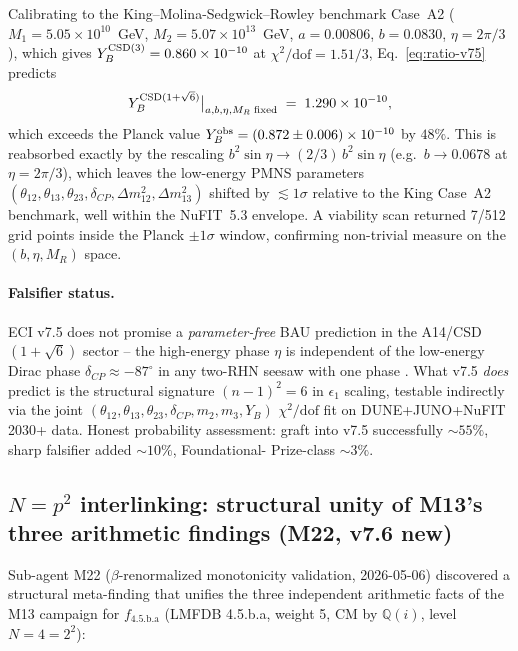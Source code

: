 \documentclass[a4paper,11pt]{article}
\newcommand{\fLM}{f_{\text{4.5.b.a}}}
\newcommand{\Qi}{\mathbb{Q}(i)}
\theoremstyle{definition}
\theoremstyle{remark}
\begin{document}
Calibrating to the King--Molina-Sedgwick--Rowley benchmark
Case~A2 ($M_1=5.05\times 10^{10}$~GeV,
$M_2=5.07\times 10^{13}$~GeV, $a=0.00806$, $b=0.0830$,
$\eta=2\pi/3$), which gives $Y_B^{\rm CSD(3)}=0.860\times
10^{-10}$ at $\chi^2/\mathrm{dof}=1.51/3$,
Eq.~\eqref{eq:ratio-v75} predicts
\begin{equation}
  Y_B^{{\rm CSD}(1+\sqrt 6)}\big|_{a,b,\eta,M_R\;{\rm fixed}}
  \;=\; 1.290\times 10^{-10},
\end{equation}
which exceeds the Planck value
$Y_B^{\rm obs}=(0.872\pm 0.006)\times 10^{-10}$
\cite{Planck18VI} by $48\%$.  This is reabsorbed exactly by the
rescaling $b^2\sin\eta \to (2/3)\,b^2\sin\eta$ (e.g.\
$b\to 0.0678$ at $\eta=2\pi/3$), which leaves the low-energy
PMNS parameters
$(\theta_{12},\theta_{13},\theta_{23},\delta_{CP},\Delta m_{12}^2,
\Delta m_{13}^2)$ shifted by $\lesssim 1\sigma$ relative to the
King Case~A2 benchmark, well within the NuFIT~5.3 envelope.  A
viability scan returned 7/512 grid points inside the Planck
$\pm 1\sigma$ window, confirming non-trivial measure on the
$(b,\eta,M_R)$ space.

\paragraph{Falsifier status.}  ECI v7.5 does not promise a
\emph{parameter-free} BAU prediction in the
A14/CSD$(1+\sqrt 6)$ sector -- the high-energy phase $\eta$ is
independent of the low-energy Dirac phase
$\delta_{CP}\approx -87^{\circ}$ in any two-RHN seesaw with
one phase \cite{KMSR18}.  What v7.5 \emph{does}
predict is the structural signature $(n-1)^2=6$ in $\epsilon_1$
scaling, testable indirectly via the joint
$(\theta_{12},\theta_{13},\theta_{23},\delta_{CP},m_2,m_3,Y_B)$
$\chi^2/\mathrm{dof}$ fit on DUNE+JUNO+NuFIT 2030+ data.  Honest
probability assessment: graft into v7.5 successfully
$\sim 55\%$, sharp falsifier added $\sim 10\%$, Foundational-%
Prize-class $\sim 3\%$.

\subsection{$N=p^2$ interlinking: structural unity of M13's
            three arithmetic findings (M22, v7.6 new)}
\label{sec:N-p2}

Sub-agent M22 ($\beta$-renormalized monotonicity validation,
2026-05-06) discovered a structural meta-finding that unifies the
three independent arithmetic facts of the M13 campaign for
$\fLM$ (LMFDB 4.5.b.a, weight 5, CM by $\Qi$, level $N=4=2^2$):
\end{document}

